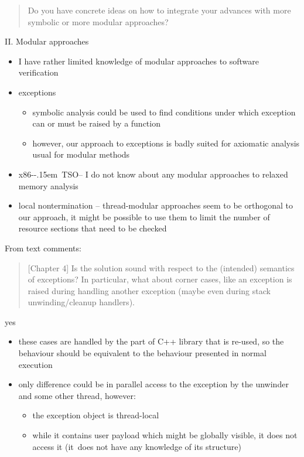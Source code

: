 \documentclass[aspectratio=169, fi]{paradise-slide}
\newcommand{\xtso}{\mbox{x86-\kern-.15em TSO}\xspace}
\newcommand{\rquote}[1]{\begin{quote}#1\end{quote}\bigskip\setlength{\leftmargini}{1em}}
\begin{document}
\begin{frame}[noframenumbering]{\qtitle}
  \rquote{Do you have concrete ideas on how to integrate your advances with more symbolic or more
    modular approaches?}

  \textrm{II.} Modular approaches
  \begin{itemize}
    \item I have rather limited knowledge of modular approaches to software verification
      \pause
    \item exceptions
      \begin{itemize}
        \item symbolic analysis could be used to find conditions under which exception can
          or must be raised by a function
        \item however, our approach to exceptions is badly suited for axiomatic analysis usual for
          modular methods
      \end{itemize}
      \pause
    \item \xtso – I do not know about any modular approaches to relaxed memory analysis
      \pause
    \item local nontermination – thread-modular approaches seem to be orthogonal to our approach,
      it might be possible to use them to limit the number of resource sections that need to be
      checked
  \end{itemize}
\end{frame}

\begin{frame}[noframenumbering]{\qtitle}
  From text comments:
  \rquote{[Chapter 4] Is the solution sound with respect to the (intended) semantics of exceptions? In
    particular, what about corner cases, like an exception is raised during handling another
    exception (maybe even during stack unwinding/cleanup handlers).}

  yes
  \begin{itemize}
    \item these cases are handled by the part of C++ library that is re-used, so the behaviour
      should be equivalent to the behaviour presented in normal execution
    \item only difference could be in parallel access to the exception by the unwinder and some other
      thread, however:
      \begin{itemize}
        \item the exception object is thread-local
        \item while it contains user payload which might be globally visible, it does not access it
          (it~does not have any knowledge of its structure)
      \end{itemize}
  \end{itemize}
\end{frame}
\end{document}
